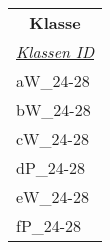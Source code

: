 \documentclass{standalone}
\begin{document}
\begin{tabular}{|l|}
    \hline
    \multicolumn{1}{c}{\cellcolor[HTML]{C0C0C0} \textbf{Klasse}} \\
    \textit{\underline{Klassen ID}} \\ \hline
    aW\_24-28\\
    bW\_24-28\\
    cW\_24-28\\
    dP\_24-28\\
    eW\_24-28\\
    fP\_24-28\\
    \hline
    \end{tabular}
\end{document}
